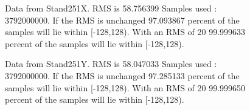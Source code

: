 \begin{figure}[ht] 				 				 				\caption{Data from Stand251X. RMS is 58.756399 Samples used : 3792000000. If the RMS is unchanged 97.093867 percent of the samples will lie within [-128,128).  				 With an RMS of 20 99.999633 percent of the samples will lie within [-128,128).} 				\end{figure} 

\begin{figure}[ht] 				 				 				\caption{Data from Stand251Y. RMS is 58.047033 Samples used : 3792000000. If the RMS is unchanged 97.285133 percent of the samples will lie within [-128,128).  				 With an RMS of 20 99.999650 percent of the samples will lie within [-128,128).} 				\end{figure} 

